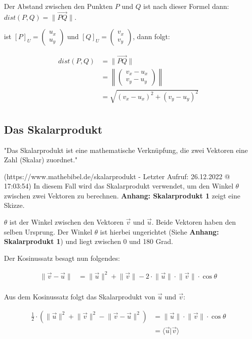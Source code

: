 \documentclass{article}
\newcommand{\m}[1]{\begin{pmatrix}#1\end{pmatrix}}
\begin{document}
    Der Abstand zwischen den Punkten $P$ und $Q$ ist nach dieser Formel dann:
    $dist(P, Q) = \lVert \vec{PQ} \rVert$.
    
    ist ${[P]}_{U} = \m{u_x \\ u_y}$ und ${[Q]}_{U} = \m{v_x \\ v_y}$, dann folgt:

    \[
      \begin{split}
        dist(P, Q) &= \lVert \vec{PQ} \rVert \\
        &= \left \lVert \m{v_x - u_x \\ v_y - u_y} \right \rVert \\
        &= \sqrt{(v_x - u_x)^2 + (v_y - u_y)^2} \\
      \end{split}  
    \] 

    \subsection{Das Skalarprodukt}
    
    "Das Skalarprodukt ist eine mathematische Verknüpfung, die zwei Vektoren eine Zahl (Skalar) zuordnet."

    (https://www.mathebibel.de/skalarprodukt - Letzter Aufruf: 26.12.2022 @ 17:03:54)
    In diesem Fall wird das Skalarprodukt verwendet, um den Winkel $\theta$ zwischen zwei Vektoren zu berechnen.
    \textbf{Anhang: Skalarprodukt 1} zeigt eine Skizze.
    
    $\theta$ ist der Winkel zwischen den Vektoren $\vec{v}$ und $\vec{u}$.
    Beide Vektoren haben den selben Ursprung. Der Winkel $\theta$ ist hierbei ungerichtet
    (Siehe \textbf{Anhang: Skalarprodukt 1}) und liegt zwischen 0 und 180 Grad.
    
    Der Kosinussatz besagt nun folgendes:

    \[
        \begin{split}
            \lVert \vec{v} - \vec{u} \rVert &= \lVert \vec{u} \rVert ^2 + \lVert \vec{v} \rVert - 2 \cdot \lVert \vec{u} \rVert \cdot \lVert \vec{v} \rVert \cdot \cos \theta \\
        \end{split}  
    \]

    Aus dem Kosinussatz folgt das Skalarprodukt von $\vec{u}$ und $\vec{v}$:

    \[
        \begin{split}
            \frac{1}{2} \cdot \left ( \lVert \vec{u} \rVert ^2 + \lVert \vec{v} \rVert ^2 - \lVert \vec{v} - \vec{u} \rVert ^2 \right ) &= \lVert \vec{u} \rVert \cdot \lVert \vec{v} \rVert \cdot \cos \theta \\
            &= \langle \vec{u} \vert \vec{v} \rangle \\
        \end{split}  
    \]
\end{document}
